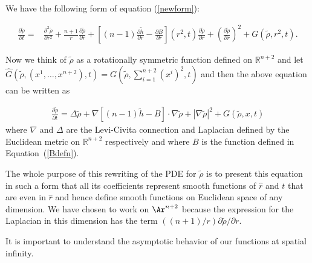 We have the following form of equation (\ref{newform}):

\begin{align*}
\frac{\partial\tilde{\rho} }{\partial t} = &
\frac{\partial^{2}\tilde{\rho}}{\partial r^{2}}+\frac{n+1}{r}\frac
{\partial\tilde{\rho}}{\partial r} +\left[ ( n-1)
\frac{\partial\tilde{h}}{\partial r} -\frac{\partial B}{\partial r}
\right] \left( r^{2},t\right) \frac{\partial\tilde{\rho} }{\partial
r} +\left( \frac{\partial\tilde{\rho} }{\partial r}\right)  ^{2}
+G(\tilde\rho,r^2,t).
\end{align*}



Now we think of $\tilde{\rho}$ as a rotationally symmetric function
defined on $\mathbb{R}^{n+2}$ and let $\widehat
G(\tilde\rho,(x^1,\ldots,x^{n+2}),t)=
G(\tilde\rho,\sum_{i=1}^{n+2}(x^i)^2,t)$ and then the above equation
can be written as

\begin{align}
\frac{\partial\tilde{\rho} }{\partial t}
 = \Delta \tilde{\rho} +  \nabla [ (n-1)\tilde{h} -B] \cdot \nabla\tilde{\rho}
+ \left | \nabla \tilde{\rho} \right |^2 +G(\tilde{\rho},x,t)
\label{betterharMapeq}
\end{align}
where $\nabla$ and $\Delta$ are the Levi-Civita connection and
Laplacian defined by the Euclidean metric on  $\mathbb{R}^{n+2}$
respectively and where $B$ is the function defined in
Equation~(\ref{Bdefn}).

\begin{remark}
\label{rem:choice-of-dimension-n-plus-2}
The whole purpose of this rewriting of the PDE for $\tilde \rho$ is
to present this equation in such a form that all its coefficients
represent smooth functions of $\hat r$ and $t$ that are even in
$\hat r$ and hence define smooth functions on Euclidean space of any
dimension. We have chosen to work on $\Ar^{n+2}$ because the
expression for the Laplacian in this dimension has the term
$((n+1)/r)\partial \tilde \rho/\partial r$.
\end{remark}

It is important to understand the asymptotic behavior of our
functions at spatial infinity.


